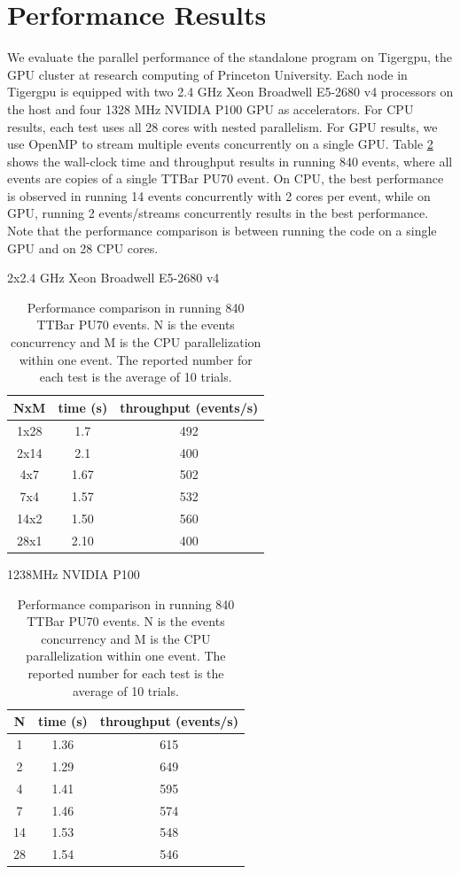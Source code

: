 \documentclass[10pt, paper=a4, UKenglish]{article}
\begin{document}
\section{Performance Results}
We evaluate the parallel performance of the standalone program on Tigergpu, the GPU cluster at research computing of Princeton University. Each node in Tigergpu is equipped with two 2.4 GHz Xeon Broadwell E5-2680 v4 processors on the host and four 1328 MHz NVIDIA P100 GPU as accelerators. For CPU results, each test uses all 28 cores with nested parallelism. For GPU results, we use OpenMP to stream multiple events concurrently on a single GPU. Table \ref{tab:perf} shows the wall-clock time and throughput results in running 840 events, where all events are copies of a single TTBar PU70 event. On CPU, the best performance is observed in running 14 events concurrently with 2 cores per event, while on GPU, running 2 events/streams concurrently results in the best performance. Note that the performance comparison is between running the code on a single GPU and on 28 CPU cores. 
\begin{table}[!htb]
    \begin{minipage}{.5\linewidth}
      \centering
          \caption*{2x2.4 GHz Xeon Broadwell E5-2680 v4}    
          \begin{tabular}{c|cc}
      \hline
      \hline
      NxM & time (s) & throughput (events/s) \\
      \hline
      1x28 &  1.7 & 492  \\
      2x14 &   2.1 & 400  \\
      4x7 & 1.67 & 502 \\
      7x4 & 1.57 & 532 \\
      14x2 & 1.50 & 560 \\
      28x1 & 2.10 & 400 \\
      \hline
      \hline
    \end{tabular}
        \end{minipage}%
    \begin{minipage}{.5\linewidth}
      \centering
             \caption*{1238MHz NVIDIA P100}    
      \begin{tabular}{c|cc}
      \hline
      \hline
      N &  time (s) & throughput (events/s)  \\
      \hline
      1 & 1.36 & 615 \\
      2 & 1.29 & 649 \\
      4 & 1.41 & 595 \\
      7 & 1.46 & 574 \\
      14 & 1.53 & 548 \\
      28 & 1.54 & 546 \\
      \hline
      \hline
    \end{tabular}
        \end{minipage} 
     \caption{Performance comparison in running 840 TTBar PU70 events. N is the events concurrency and M is the CPU parallelization within one event. The reported number for each test is the average of 10 trials.}
     \label{tab:perf}
     \end{table}
\end{document}
